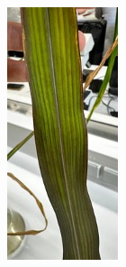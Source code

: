 \documentclass[10pt,a4paper]{article}
\begin{document}
\begin{figure}[H]
\begin{subfigure}[b]{0.235\textwidth}
				\includegraphics[width=\textwidth]{MinusP_.jpg}

\end{subfigure}
\end{figure}
\end{document}
